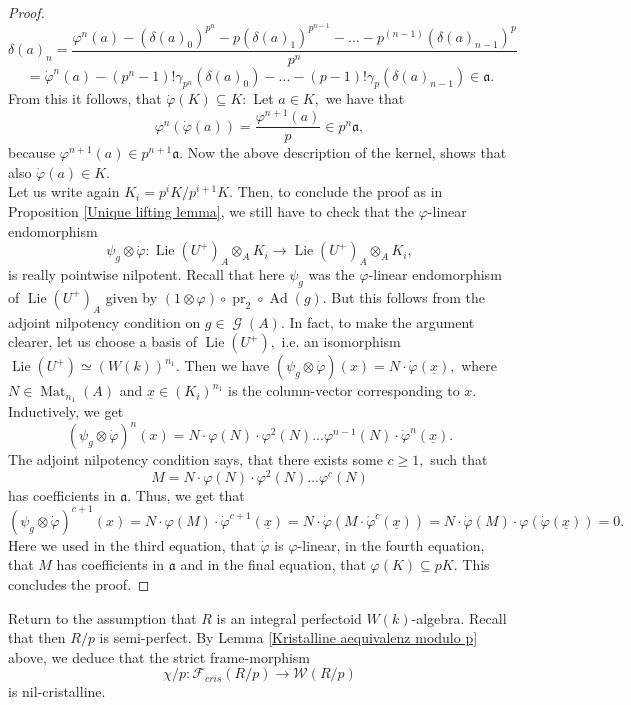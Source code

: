 \documentclass[a4paper,10,5 pt]{amsart}
\theoremstyle{definition}
\DeclareMathOperator{\Lie}{Lie}
\DeclareMathOperator{\Ad}{Ad}
\DeclareMathOperator{\G}{\mathcal{G}}
\DeclareMathOperator{\pr}{pr}
\DeclareMathOperator{\Mat}{Mat}
\begin{document}
\begin{proof}
$$\delta(a)_{n}=\frac{\varphi^{n}(a)-(\delta(a)_{0})^{p^{n}}-p(\delta(a)_{1})^{p^{n-1}}-...-p^{(n-1)}(\delta(a)_{n-1})^{p}}{p^{n}}
$$
$$
= \dot{\varphi}^{n}(a)-(p^{n}-1)!\gamma_{p^{n}}(\delta(a)_{0})-...-(p-1)!\gamma_{p}(\delta(a)_{n-1})\in \mathfrak{a}.
$$
From this it follows, that
$\dot{\varphi}(K)\subseteq K:$ Let $a\in K,$ we have that
$$\varphi^{n}(\dot{\varphi}(a))=\frac{\varphi^{n+1}(a)}{p}\in p^{n}\mathfrak{a},$$
because $\varphi^{n+1}(a)\in p^{n+1}\mathfrak{a}.$ Now the above description of the kernel, shows that also $\dot{\varphi}(a)\in K.$
\\
Let us write again $K_{i}=p^{i}K/p^{i+1}K.$ Then, to conclude the proof as in Proposition \ref{Unique lifting lemma}, we still have to check that the $\varphi$-linear endomorphism
$$
\psi_{g}\otimes \dot{\varphi}\colon \Lie(U^{+})_{A} \otimes_{A} K_{i} \rightarrow  \Lie(U^{+})_{A}\otimes_{A} K_{i},
$$
is really pointwise nilpotent.
Recall that here $\psi_{g}$ was the $\varphi$-linear endomorphism of $\Lie(U^{+})_{A}$ given by $(1\otimes \varphi)\circ \pr_{2} \circ \Ad(g).$ But this follows from the adjoint nilpotency condition on $g\in \G(A)$. In fact, to make the argument clearer, let us choose a basis of $\Lie(U^{+}),$ i.e. an isomorphism $\Lie(U^{+})\simeq (W(k))^{n_{1}}.$ Then we have $(\psi_{g}\otimes \dot{\varphi})(x)=N\cdot \dot{\varphi}(\underline{x}),$ where $N\in\Mat_{n_{1}}(A)$ and $\underline{x}\in (K_{i})^{n_{1}}$ is the column-vector corresponding to $x$. Inductively, we get
$$
(\psi_{g}\otimes \dot{\varphi})^{n}(x)=N\cdot \varphi(N)\cdot \varphi^{2}(N) ...\varphi^{n-1}(N)\cdot \dot{\varphi}^{n}(\underline{x}).
$$
The adjoint nilpotency condition says, that there exists some $c\geq 1,$ such that
$$
M=N\cdot \varphi(N)\cdot \varphi^{2}(N) ...\varphi^{c}(N)
$$
has coefficients in $\mathfrak{a}.$ Thus, we get that $$(\psi_{g}\otimes \dot{\varphi})^{c+1}(x)=N\cdot \varphi(M)\cdot \dot{\varphi}^{c+1}(\underline{x})=N\cdot\dot{\varphi}(M\cdot \dot{\varphi}^{c}(\underline{x}))=N\cdot \dot{\varphi}(M)\cdot\varphi(\dot{\varphi}(\underline{x}))=0.$$
Here we used in the third equation, that $\dot{\varphi}$ is $\varphi$-linear, in the fourth equation, that $M$ has coefficients in $\mathfrak{a}$ and in the final equation, that $\varphi(K)\subseteq pK.$ This concludes the proof.
\end{proof}
Return to the assumption that $R$ is an integral perfectoid $W(k)$-algebra. Recall that then $R/p$ is semi-perfect. By Lemma \ref{Kristalline aequivalenz modulo p} above, we deduce that the strict frame-morphism
$$
\chi/p\colon \mathcal{F}_{cris}(R/p) \rightarrow \mathcal{W}(R/p)
$$
is nil-cristalline. 
\end{document}
